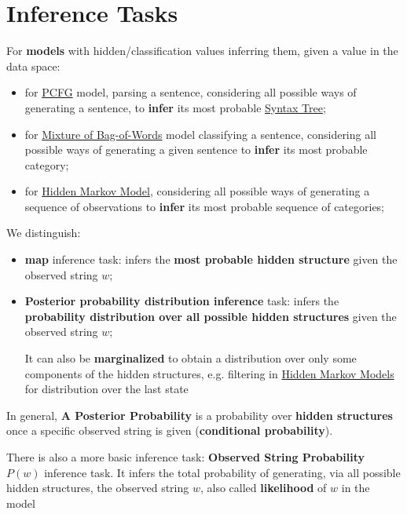 \chapter{Inference Tasks}\label{chap:in_inference_tasks} %
For \textbf{models} with hidden/classification values inferring them, given a value in the data space:
\begin{itemize}
    \item for \hyperref[def:pcfg]{PCFG} model, parsing a sentence, considering all possible ways of generating a sentence, to \textbf{infer} its most probable \hyperref[def:pg-syntax-tree]{Syntax Tree};
    \item for \hyperref[sub:lm_mixture_of_bag_of_words]{Mixture of Bag-of-Words} model classifying a sentence, considering all possible ways of generating a given sentence to \textbf{infer} its most probable category;
    \item for \hyperref[def:hmm]{Hidden Markov Model}, considering all possible ways of generating a sequence of observations to \textbf{infer} its most probable sequence of categories;
\end{itemize}
We distinguish:
\begin{itemize}
    \item \textbf{\ac{map}} inference task: infers the \textbf{most probable hidden structure} given the observed string $w$;
    \item \textbf{Posterior probability distribution inference} task: infers the \textbf{probability distribution over all possible hidden structures} given the observed string $w$;
        \begin{note}
            It can also be \textbf{marginalized} to obtain a distribution over only some components of the hidden structures, e.g. filtering in \hyperref[def:hmm]{Hidden Markov Models} for distribution over the last state
        \end{note}
\end{itemize}
In general, \textbf{A Posterior Probability} is a probability over \textbf{hidden structures} once a specific observed string is given (\textbf{conditional probability}). 
\begin{note}[Technically]
    There is also a more basic inference task: \textbf{Observed String Probability} $P(w)$ inference task.
    It infers the total probability of generating, via all possible hidden structures,  the observed string $w$, also called \textbf{likelihood} of $w$ in the model
\end{note}
%
